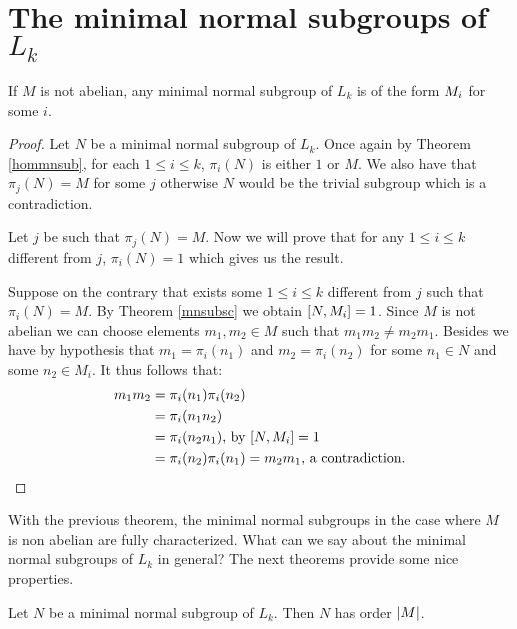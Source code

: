 \section{The minimal normal subgroups of \texorpdfstring{$L_k$}{Lk}}

\begin{theorem}
    \label{nabmnsub}
    If $M$ is not abelian, any minimal normal subgroup of $L_k$ is of the form $M_{i}$ for some $i$.
\end{theorem}

\begin{proof}
    Let $N$ be a minimal normal subgroup of $L_k$.
    Once again by Theorem \ref{hommnsub}, for each $1 \le i \le k$, $\pi_i(N)$ is either $1$ or $M$. We also have that $\pi_j(N) = M$ for some $j$ otherwise $N$ would be the trivial subgroup which is a contradiction.

    Let $j$ be such that $\pi_j(N) = M$. Now we will prove that for any $1 \le i \le k$ different from $j$, $\pi_i(N) = 1$ which gives us the result.
    
    Suppose on the contrary that exists some $1 \le i \le k$ different from $j$ such that $\pi_i(N) = M$.
    By Theorem \ref{mnsubsc} we obtain $[N, M_{i}] = 1$. Since $M$ is not abelian we can choose elements $m_1, m_2 \in M$ such that $m_1m_2 \ne m_2m_1$. Besides we have by hypothesis that $m_1 = \pi_i(n_1)$ and $m_2 = \pi_i(n_2)$ for some $n_1 \in N$ and some  $n_2 \in M_i$. It thus follows that:
    \begin{align*}
       m_1m_2 &= \pi_i(n_1)\pi_i(n_2) \\
              &= \pi_i(n_1n_2) \\
              &= \pi_i(n_2n_1) \text{, by } [N, M_{i}] = 1 \\
              &= \pi_i(n_2)\pi_i(n_1) = m_2m_1 \text{, a contradiction.}
    \end{align*}

\end{proof}

With the previous theorem, the minimal normal subgroups in the case where $M$ is non abelian are fully characterized.
What can we say about the minimal normal subgroups of $L_k$ in general? The next theorems provide some nice properties.

\begin{theorem}
    \label{abmnsub}
    Let $N$ be a minimal normal subgroup of $L_k$. Then $N$ has order $| M |$. 
    
\end{theorem}

